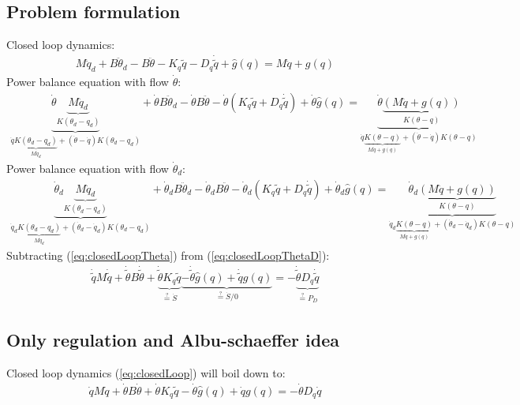 \documentclass[11pt]{article}
\begin{document}
\subsection{Problem formulation}
Closed loop dynamics: 
\begin{align}
 M \ddot{q}_d + B\ddot{\theta}_d - B \ddot{\theta} - K_q \tilde{q} - D_q \dot{\tilde{q}} + \hat{g}(q)  = M \ddot{q} + g(q)
\end{align}
Power balance equation with flow $\dot{\theta}$: 
\begin{align}
\underbrace{\dot{\theta}\underbrace{M \ddot{q}_d}_{K(\theta_d-q_d)}}_{\dot{q}\underbrace{K(\theta_d-q_d)}_{M\ddot{q}_d} + (\dot{\theta}-\dot{q})K(\theta_d-q_d)} + \dot{\theta}B\ddot{\theta}_d - \dot{\theta}B \ddot{\theta} - \dot{\theta}(K_q \tilde{q} + D_q \dot{\tilde{q}}) + \dot{\theta}\hat{g}(q) = \underbrace{\dot{\theta}\underbrace{(M \ddot{q} + g(q))}_{K(\theta-q)}}_{\dot{q}\underbrace{K(\theta-q)}_{M\ddot{q}+g(q)}+(\dot{\theta}-\dot{q})K(\theta-q)} \label{eq:closedLoopTheta}
\end{align}
Power balance equation with flow $\dot{\theta}_d$: 
\begin{align}
\underbrace{\dot{\theta}_d\underbrace{M \ddot{q}_d}_{K(\theta_d-q_d)}}_{\dot{q}_d\underbrace{K(\theta_d-q_d)}_{M\ddot{q}_d} + (\dot{\theta}_d-\dot{q}_d)K(\theta_d-q_d)} + \dot{\theta}_dB\ddot{\theta}_d - \dot{\theta}_dB \ddot{\theta} - \dot{\theta}_d(K_q \tilde{q} + D_q \dot{\tilde{q}}) + \dot{\theta}_d\hat{g}(q) = \underbrace{\dot{\theta}_d\underbrace{(M \ddot{q} + g(q))}_{K(\theta-q)}}_{\dot{q}_d\underbrace{K(\theta-q)}_{M\ddot{q}+g(q)}+(\dot{\theta}_d-\dot{q}_d)K(\theta-q)} \label{eq:closedLoopThetaD}
\end{align}
Subtracting (\ref{eq:closedLoopTheta}) from (\ref{eq:closedLoopThetaD}):
\begin{align}
\dot{\tilde{q}}M\dot{\tilde{q}} + \dot{\tilde{\theta}}B\dot{\tilde{\theta}} + \underbrace{\dot{\tilde{\theta}}K_q\tilde{q}}_{ \stackrel{?}{=} \dot{S}} \underbrace{- \dot{\tilde{\theta}}\hat{g}(q) + \dot{\tilde{q}}g(q)}_{ \stackrel{?}{=} \dot{S}/0} = -\underbrace{\dot{\tilde{\theta}}D_q\dot{\tilde{q}}}_{ \stackrel{?}{=} P_D} \label{eq:closedLoop}
\end{align} 
\subsection{Only regulation and Albu-schaeffer idea}
Closed loop dynamics (\ref{eq:closedLoop}) will boil down to: 
\begin{align}
\dot{q}M\dot{q} + \dot{\theta}B\dot{\theta} + \dot{\theta}K_q\tilde{q} - \dot{\theta}\hat{g}(q) + \dot{q}g(q) = -\dot{\theta}D_q\dot{q}
\end{align}

{}
%
\end{document}
